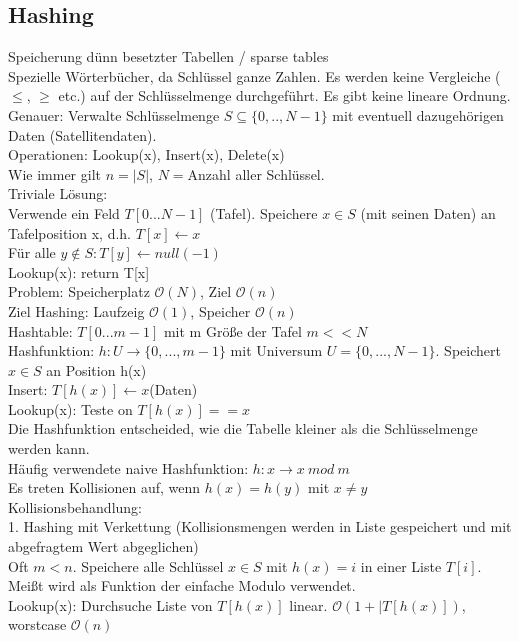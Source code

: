 \documentclass[a4paper]{article}
\newcommand{\oh}[1]{$\mathcal{O}(#1)$}
\begin{document}
\subsection{Hashing}
Speicherung dünn besetzter Tabellen / sparse tables\\
Spezielle Wörterbücher, da Schlüssel ganze Zahlen. Es werden keine Vergleiche ($\leq$, $\geq$ etc.) auf der Schlüsselmenge durchgeführt. Es gibt keine lineare Ordnung.\\
Genauer: Verwalte Schlüsselmenge $S\subseteq \{0,..,N-1\}$ mit eventuell dazugehörigen Daten (Satellitendaten).\\
Operationen: Lookup(x), Insert(x), Delete(x)\\
Wie immer gilt $n=|S|$, $N=$Anzahl aller Schlüssel.\\
Triviale Lösung: \\
Verwende ein Feld $T[0...N-1]$ (Tafel). Speichere $x\in S$ (mit seinen Daten) an Tafelposition x, d.h. $T[x] \leftarrow x$\\
Für alle $y  \not\in S: T[y] \leftarrow null (-1)$\\
Lookup(x): return T[x]\\
Problem: Speicherplatz \oh{N}, Ziel \oh{n}\\
Ziel Hashing: Laufzeig \oh{1}, Speicher \oh{n}\\
Hashtable: $T[0...m-1]$ mit m Größe der Tafel $m<<N$\\
Hashfunktion: $h: U \rightarrow \{0,...,m-1\}$ mit Universum $U=\{0,...,N-1\}$. Speichert $x\in S$ an Position h(x)\\
Insert: $T[h(x)] \leftarrow x $(Daten)\\
Lookup(x): Teste on $T[h(x)] == x$\\
Die Hashfunktion entscheided, wie die Tabelle kleiner als die Schlüsselmenge werden kann.\\
Häufig verwendete naive Hashfunktion: $h:x\rightarrow x\ mod\ m$\\
Es treten Kollisionen auf, wenn $h(x)=h(y)$ mit $x\neq y$\\
Kollisionsbehandlung:\\
1. Hashing mit Verkettung (Kollisionsmengen werden in Liste gespeichert und mit abgefragtem Wert abgeglichen)\\
Oft $m < n$. Speichere alle Schlüssel $x\in S$ mit $h(x)=i$ in einer Liste $T[i]$. Meißt wird als Funktion der einfache Modulo verwendet.\\
Lookup(x): Durchsuche Liste von $T[h(x)]$ linear. \oh{1+|T[h(x)]}, worstcase \oh{n}\\
\end{document}
